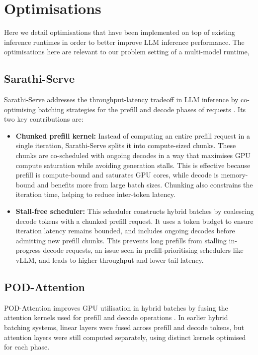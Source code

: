 \documentclass[11pt,twoside]{report}
\begin{document}
\section{Optimisations}\label{section:optimisations}
Here we detail optimisations that have been implemented on top of existing inference runtimes in order to better improve LLM inference performance.
The optimisations here are relevant to our problem setting of a multi-model runtime,  

\subsection{Sarathi-Serve}
Sarathi-Serve addresses the throughput-latency tradeoff in LLM inference by co-optimising batching strategies for the prefill and decode phases of requests \cite{agrawal2024taming}. 
Its two key contributions are:

\begin{itemize}
  \item \textbf{Chunked prefill kernel:} Instead of computing an entire prefill request in a single iteration, Sarathi-Serve splits it into compute-sized chunks. 
    These chunks are co-scheduled with ongoing decodes in a way that maximises GPU compute saturation while avoiding generation stalls. 
    This is effective because prefill is compute-bound and saturates GPU cores, while decode is memory-bound and benefits more from large batch sizes. 
    Chunking also constrains the iteration time, helping to reduce inter-token latency.

  \item \textbf{Stall-free scheduler:} This scheduler constructs hybrid batches by coalescing decode tokens with a chunked prefill request. 
    It uses a token budget to ensure iteration latency remains bounded, and includes ongoing decodes before admitting new prefill chunks. 
    This prevents long prefills from stalling in-progress decode requests, an issue seen in prefill-prioritising schedulers like vLLM, and leads to higher throughput and lower tail latency.
\end{itemize}

\subsection{POD-Attention}
POD-Attention improves GPU utilisation in hybrid batches by fusing the attention kernels used for prefill and decode operations \cite{kamath2025pod}. 
In earlier hybrid batching systems, linear layers were fused across prefill and decode tokens, but attention layers were still computed separately, using distinct kernels optimised for each phase.
\end{document}

